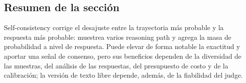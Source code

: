 \subsection{Resumen de la sección}

Self-consistency corrige el desajuste entre la trayectoria más probable y la respuesta más probable: muestrea varios reasoning path y agrega la masa de probabilidad a nivel de respuesta. Puede elevar de forma notable la exactitud y aportar una señal de consenso, pero sus beneficios dependen de la diversidad de las muestras, del análisis de las respuestas, del presupuesto de costo y de la calibración; la versión de texto libre depende, además, de la fiabilidad del judge.
